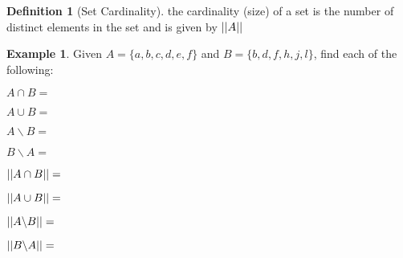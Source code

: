 \documentclass[addpoints,12pt]{exam}
\theoremstyle{definition}
\newtheorem{example}{Example}[subsection]
\newtheorem{definition}{Definition}[subsection]
\begin{document}
\vspace{.2in}
\begin{definition}[Set Cardinality]
the cardinality (size) of a set is the number of distinct elements in the set and is given by $\abs{\abs{A}}$
\end{definition}
\vspace{.2in}
\begin{example}
Given $A = \{a,b,c,d,e,f\}$ and $B = \{b,d,f,h,j,l\}$, find each of the following:
\begin{enumerate}
\begin{minipage}{.5\textwidth}

\item $A \cap B = $
\vspace{.25in}
\item $A \cup B = $
\vspace{.25in}
\item $A\backslash B = $
\vspace{.25in}
\item $B\backslash A = $
\vspace{.25in}
\end{minipage}%
\begin{minipage}{.5\textwidth}
\item $\abs{\abs{A \cap B}} = $
\vspace{.25in}
\item $\abs{\abs{A \cup B }}= $
\vspace{.25in}
\item $\abs{\abs{A\backslash B}} = $
\vspace{.25in}
\item $\abs{\abs{B\backslash A}} = $
\vspace{.25in}

\end{minipage}%
\end{enumerate}
\end{example}
\end{document}
